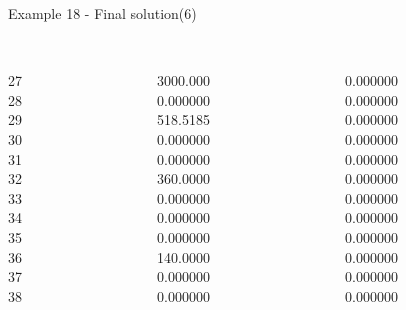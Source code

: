 \begin{frame}{Example 18 - Final solution(6)}
\begin{columns}[t]
\begin{column}{0.3\textwidth}
\\
27\\
28\\
29\\
30\\
31\\
32\\
33\\
34\\
35\\
36\\
37\\
38\\

\end{column}
\begin{column}{0.3\textwidth}
\\
3000.000\\
0.000000\\
518.5185\\
0.000000\\
0.000000\\
360.0000\\
0.000000\\
0.000000\\
0.000000\\
140.0000\\
0.000000\\
0.000000\\

\end{column}  

\begin{column}{0.3\textwidth}
\\
0.000000\\
0.000000\\
0.000000\\
0.000000\\
0.000000\\
0.000000\\
0.000000\\
0.000000\\
0.000000\\
0.000000\\
0.000000\\
0.000000\\
\end{column}
\end{columns}
\end{frame}
